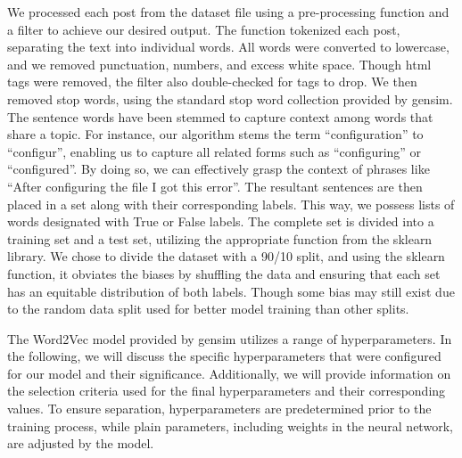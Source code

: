 \documentclass[english,bachelor]{swsLeipzig}
\begin{document}
We processed each post from the dataset file using a pre-processing function and a filter to achieve our desired 
output. The function tokenized each post, separating the text into individual words. All words were converted to lowercase, and we removed punctuation, numbers, and excess white space. Though html tags were removed, the filter also double-checked for tags to drop. We then removed stop words, using the standard stop word collection provided by gensim. The sentence words have been stemmed to capture context among words that share a topic. For instance, our algorithm stems the term ``configuration'' to ``configur'', enabling us to capture all related forms such as ``configuring'' or ``configured''. By doing so, we can effectively grasp the context of phrases like ``After configuring the file I got this error''. The resultant sentences are then placed in a set along with their corresponding labels. This way, we possess lists of words designated with True or False labels. The complete set is divided into a training set and a test set, utilizing the appropriate function from the sklearn library. We chose to divide the dataset with a 90/10 split, and using the sklearn function, it obviates the biases by shuffling the data and ensuring that each set has an equitable distribution of both labels. Though some bias may still exist due to the random data split used for better model training than other splits.

The Word2Vec model provided by gensim utilizes a range of hyperparameters. In the following, we will discuss the 
specific hyperparameters that were configured for our model and their significance. Additionally, we will provide information on the selection criteria used for the final hyperparameters and their corresponding values. To ensure separation, hyperparameters are predetermined prior to the training process, while plain parameters, including weights in the neural network, are adjusted by the model.
\end{document}
